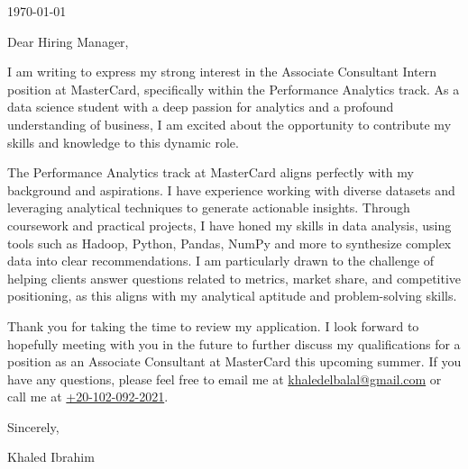 \documentclass{ExpressiveCoverLetter}
\begin{document}
\coverletterheader[
    firstname=Khaled,
    middleinitial=A,
    lastname=Ibrahim,
    email=khaledelbalal@gmail.com,
    phone=(+20)1020922021,
    linkedin=KhaledElbalal,
]

\vspace{0.25in}
\today
\vspace{0.15in}


Dear Hiring Manager,

I am writing to express my strong interest in the Associate Consultant Intern position at MasterCard, specifically within the Performance Analytics track. As a data science student with a deep passion for analytics and a profound understanding of business, I am excited about the opportunity to contribute my skills and knowledge to this dynamic role.

The Performance Analytics track at MasterCard aligns perfectly with my
background and aspirations. I have experience working with diverse
datasets and leveraging analytical techniques to generate actionable
insights. Through coursework and practical projects, I have honed my
skills in data analysis, using tools such as Hadoop, Python, Pandas, NumPy and more to
synthesize complex data into clear recommendations. I am particularly
drawn to the challenge of helping clients answer questions related to
metrics, market share, and competitive positioning, as this aligns with
my analytical aptitude and problem-solving skills.

Thank you for taking the time to review my application. I look forward
to hopefully meeting with you in the future to further discuss my
qualifications for a position as an Associate Consultant at MasterCard
this upcoming summer. If you have any questions, please feel free to
email me at \href{mailto:khaledelbalal@gmail.com}{khaledelbalal@gmail.com} or
call me at \href{tel:+20-102-092-2021}{+20-102-092-2021}.

Sincerely,

\vspace{.15in}

Khaled Ibrahim
\end{document}
